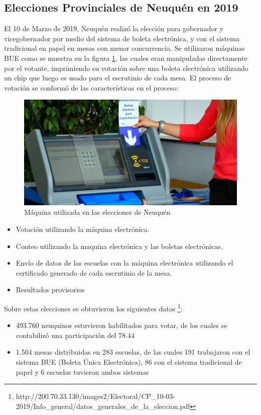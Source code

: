 \subsection{Elecciones Provinciales de Neuquén en 2019}
El 10 de Marzo de 2019, Neuquén realizó la elección para gobernador y vicegobernador por medio del sistema de boleta electrónica, y con el sistema tradicional en papel en mesas con menor concurrencia. Se utilizaron máquinas BUE como se muestra en la figura \ref{fig:maquinasBUE}, las cuales eran manipuladas directamente por el votante, imprimiendo su votación sobre una boleta electrónica utilizando un chip que luego es usado para el escrutinio de cada mesa. El proceso de votación se conformó de las características en el proceso:
\begin{figure}
\begin{center}
  \includegraphics[scale=0.4]{img/Maquina_BUE.jpg}
  \caption{Máquina utilizada en las elecciones de Neuquén}
  \label{fig:maquinasBUE}
\end{center}
\end{figure}
\begin{itemize}
    \item Votación utilizando la máquina electrónica.
    \item Conteo utilizando la maquina electrónica y las boletas electrónicas.
    \item Envío de datos de las escuelas con la máquina electrónica utilizando el certificado generado de cada escrutinio de la mesa.
    \item Resultados provisorios
\end{itemize}

\newline Sobre estas elecciones se obtuvieron los siguientes datos \footnote{http://200.70.33.130/images2/Electoral/CP_10-03-2019/Info\_general/datos\_generales\_de\_la\_eleccion.pdf}:
\begin{itemize}
    \item 493.760 neuquinos estuvieron habilitados para votar, de los cuales se contabilizó una participación del 78.44%
    \item 1.504 mesas distribuidas en 283 escuelas, de las cuales 191 trabajaron con el sistema BUE (Boleta Única Electrónica), 86 con el sistema tradicional de papel y 6 escuelas tuvieron ambos sistemas
\end{itemize}


